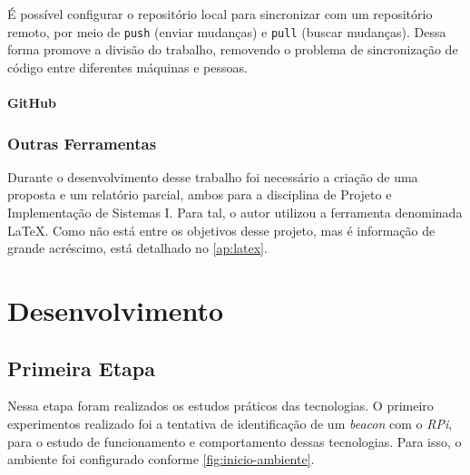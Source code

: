 \documentclass[
		12pt,				%
		openright,			%
		oneside,			%
		a4paper,			%
		chapter=TITLE,		%
		english,			%
		brazil				%
	]{abntex2}
\begin{document}
É possível configurar o repositório local para sincronizar com um repositório remoto, por meio de \texttt{push} (enviar mudanças) e \texttt{pull} (buscar mudanças). Dessa forma promove a divisão do trabalho, removendo o problema de sincronização de código entre diferentes máquinas e pessoas.

\subsubsection{GitHub}\label{sec:github}



\subsection{Outras Ferramentas}\label{sec:outras-ferramentas}

Durante o desenvolvimento desse trabalho foi necessário a criação de uma proposta e um relatório parcial, ambos para a disciplina de Projeto e Implementação de Sistemas I. Para tal, o autor utilizou a ferramenta denominada LaTeX. Como não está entre os objetivos desse projeto, mas é informação de grande acréscimo, está detalhado no \autoref{ap:latex}.




\chapter{Desenvolvimento}\label{cap:desenvolvimento}

\section{Primeira Etapa}\label{sec:primeira-etapa}

Nessa etapa foram realizados os estudos práticos das tecnologias. O primeiro experimentos realizado foi a tentativa de identificação de um \textit{beacon} com o \textit{RPi}, para o estudo de funcionamento e comportamento dessas tecnologias. Para isso, o ambiente foi configurado conforme \autoref{fig:inicio-ambiente}. 
\end{document}
